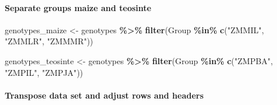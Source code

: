 \documentclass[
]{article}
\newenvironment{Shaded}{\begin{snugshade}}{\end{snugshade}}
\newcommand{\FunctionTok}[1]{\textcolor[rgb]{0.13,0.29,0.53}{\textbf{#1}}}
\newcommand{\NormalTok}[1]{#1}
\newcommand{\OtherTok}[1]{\textcolor[rgb]{0.56,0.35,0.01}{#1}}
\newcommand{\SpecialCharTok}[1]{\textcolor[rgb]{0.81,0.36,0.00}{\textbf{#1}}}
\newcommand{\StringTok}[1]{\textcolor[rgb]{0.31,0.60,0.02}{#1}}
\begin{document}
\paragraph{Separate groups maize and
teosinte}\label{separate-groups-maize-and-teosinte}

\begin{Shaded}
\begin{Highlighting}[]
\NormalTok{genotypes\_maize }\OtherTok{\textless{}{-}}\NormalTok{ genotypes }\SpecialCharTok{\%\textgreater{}\%} 
  \FunctionTok{filter}\NormalTok{(Group }\SpecialCharTok{\%in\%} \FunctionTok{c}\NormalTok{(}\StringTok{"ZMMIL"}\NormalTok{, }\StringTok{"ZMMLR"}\NormalTok{, }\StringTok{"ZMMMR"}\NormalTok{)) }

\NormalTok{genotypes\_teosinte }\OtherTok{\textless{}{-}}\NormalTok{ genotypes }\SpecialCharTok{\%\textgreater{}\%} 
  \FunctionTok{filter}\NormalTok{(Group }\SpecialCharTok{\%in\%} \FunctionTok{c}\NormalTok{(}\StringTok{"ZMPBA"}\NormalTok{, }\StringTok{"ZMPIL"}\NormalTok{, }\StringTok{"ZMPJA"}\NormalTok{))}
\end{Highlighting}
\end{Shaded}

\paragraph{Transpose data set and adjust rows and
headers}\label{transpose-data-set-and-adjust-rows-and-headers}
\end{document}
